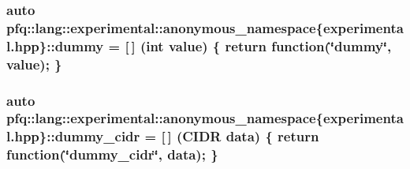 \subsubsection[{\texorpdfstring{dummy}{dummy}}]{\setlength{\rightskip}{0pt plus 5cm}auto pfq\+::lang\+::experimental\+::anonymous\+\_\+namespace\{experimental.\+hpp\}\+::dummy = \mbox{[}$\,$\mbox{]} (int value) \{ return {\bf function}(\char`\"{}dummy\char`\"{}, value); \}}\hypertarget{namespacepfq_1_1lang_1_1experimental_1_1anonymous__namespace_02experimental_8hpp_03_a5fc8274e9598b8524f833264174b62b7}{}\label{namespacepfq_1_1lang_1_1experimental_1_1anonymous__namespace_02experimental_8hpp_03_a5fc8274e9598b8524f833264174b62b7}
\subsubsection[{\texorpdfstring{dummy\+\_\+cidr}{dummy_cidr}}]{\setlength{\rightskip}{0pt plus 5cm}auto pfq\+::lang\+::experimental\+::anonymous\+\_\+namespace\{experimental.\+hpp\}\+::dummy\+\_\+cidr = \mbox{[}$\,$\mbox{]} ({\bf C\+I\+DR} data) \{ return {\bf function}(\char`\"{}dummy\+\_\+cidr\char`\"{}, data); \}}\hypertarget{namespacepfq_1_1lang_1_1experimental_1_1anonymous__namespace_02experimental_8hpp_03_a331aab492ad841b1c7a0d95efea00e76}{}\label{namespacepfq_1_1lang_1_1experimental_1_1anonymous__namespace_02experimental_8hpp_03_a331aab492ad841b1c7a0d95efea00e76}
